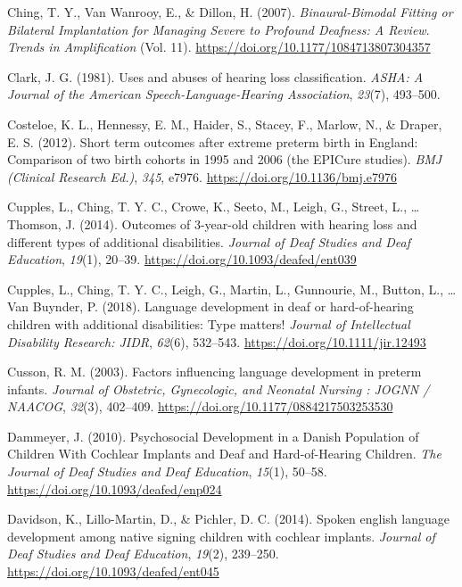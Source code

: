 \documentclass[english,man]{apa6}
\begin{document}
\leavevmode\hypertarget{ref-ching2007}{}%
Ching, T. Y., Van Wanrooy, E., \& Dillon, H. (2007). \emph{Binaural-Bimodal Fitting or Bilateral Implantation for Managing Severe to Profound Deafness: A Review}. \emph{Trends in Amplification} (Vol. 11). \url{https://doi.org/10.1177/1084713807304357}

\leavevmode\hypertarget{ref-clark1981}{}%
Clark, J. G. (1981). Uses and abuses of hearing loss classification. \emph{ASHA: A Journal of the American Speech-Language-Hearing Association}, \emph{23}(7), 493--500.

\leavevmode\hypertarget{ref-costeloe2012}{}%
Costeloe, K. L., Hennessy, E. M., Haider, S., Stacey, F., Marlow, N., \& Draper, E. S. (2012). Short term outcomes after extreme preterm birth in England: Comparison of two birth cohorts in 1995 and 2006 (the EPICure studies). \emph{BMJ (Clinical Research Ed.)}, \emph{345}, e7976. \url{https://doi.org/10.1136/bmj.e7976}

\leavevmode\hypertarget{ref-cupples2014}{}%
Cupples, L., Ching, T. Y. C., Crowe, K., Seeto, M., Leigh, G., Street, L., \ldots{} Thomson, J. (2014). Outcomes of 3-year-old children with hearing loss and different types of additional disabilities. \emph{Journal of Deaf Studies and Deaf Education}, \emph{19}(1), 20--39. \url{https://doi.org/10.1093/deafed/ent039}

\leavevmode\hypertarget{ref-cupples2018}{}%
Cupples, L., Ching, T. Y. C., Leigh, G., Martin, L., Gunnourie, M., Button, L., \ldots{} Van Buynder, P. (2018). Language development in deaf or hard-of-hearing children with additional disabilities: Type matters! \emph{Journal of Intellectual Disability Research: JIDR}, \emph{62}(6), 532--543. \url{https://doi.org/10.1111/jir.12493}

\leavevmode\hypertarget{ref-cusson2003}{}%
Cusson, R. M. (2003). Factors influencing language development in preterm infants. \emph{Journal of Obstetric, Gynecologic, and Neonatal Nursing : JOGNN / NAACOG}, \emph{32}(3), 402--409. \url{https://doi.org/10.1177/0884217503253530}

\leavevmode\hypertarget{ref-dammeyer2010}{}%
Dammeyer, J. (2010). Psychosocial Development in a Danish Population of Children With Cochlear Implants and Deaf and Hard-of-Hearing Children. \emph{The Journal of Deaf Studies and Deaf Education}, \emph{15}(1), 50--58. \url{https://doi.org/10.1093/deafed/enp024}

\leavevmode\hypertarget{ref-davidson2014}{}%
Davidson, K., Lillo-Martin, D., \& Pichler, D. C. (2014). Spoken english language development among native signing children with cochlear implants. \emph{Journal of Deaf Studies and Deaf Education}, \emph{19}(2), 239--250. \url{https://doi.org/10.1093/deafed/ent045}
\end{document}
